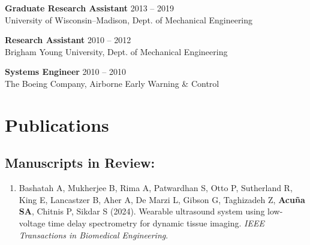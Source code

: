 \documentclass[letterpaper, 10pt]{article}
\begin{document}
\textbf{Graduate Research Assistant}
\hfill 2013 -- 2019\\ %
University of Wisconsin–Madison, Dept. of Mechanical Engineering  %
\medskip

\textbf{Research Assistant}
\hfill 2010 -- 2012\\ %
Brigham Young University, Dept. of Mechanical Engineering %
\medskip

\textbf{Systems Engineer}
\hfill 2010 -- 2010\\ %
The Boeing Company, Airborne Early Warning \& Control %

\section{Publications}

\subsection{Manuscripts in Review:}
\begin{enumerate}
    \item Bashatah A, Mukherjee B, Rima A, Patwardhan S, Otto P, Sutherland R, King E, Lancastzer B, Aher A, De Marzi L, Gibson G, Taghizadeh Z, \textbf{Acuña SA}, Chitnis P, Sikdar S (2024). Wearable ultrasound system using low-voltage time delay spectrometry for dynamic tissue imaging. \textit{IEEE Transactions in Biomedical Engineering}.
\end{enumerate}
\end{document}

